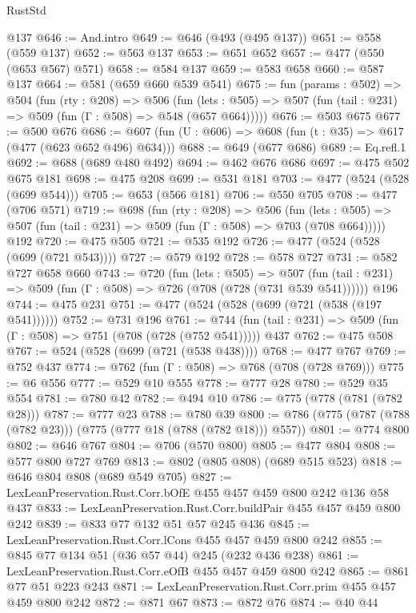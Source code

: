 \begin{lexlean}{RustStd}
\begin{coremodule}
    @137
@646 := And.intro
@649 := @646 (@493 (@495 @137))
@651 := @558 (@559 @137)
@652 := @563 @137
@653 := @651 @652
@657 := @477 (@550 (@653 @567) @571)
@658 := @584 @137
@659 := @583 @658
@660 := @587 @137
@664 := @581 (@659 @660 @539 @541)
@675 := fun (params : @502) =>
  @504
    (fun (rty : @208) =>
    @506
      (fun (lets : @505) => @507 (fun (tail : @231) => @509 (fun (Γ : @508) => @548 (@657 @664)))))
@676 := @503 @675
@677 := @500 @676
@686 := @607 (fun (U : @606) => @608 (fun (t : @35) => @617 (@477 (@623 @652 @496) @634)))
@688 := @649 (@677 @686)
@689 := Eq.refl.{1}
@692 := @688 (@689 @480 @492)
@694 := @462 @676 @686
@697 := @475 @502 @675 @181
@698 := @475 @208
@699 := @531 @181
@703 := @477 (@524 (@528 (@699 @544)))
@705 := @653 (@566 @181)
@706 := @550 @705
@708 := @477 (@706 @571)
@719 := @698
    (fun (rty : @208) =>
    @506
      (fun (lets : @505) => @507 (fun (tail : @231) => @509 (fun (Γ : @508) => @703 (@708 @664)))))
    @192
@720 := @475 @505
@721 := @535 @192
@726 := @477 (@524 (@528 (@699 (@721 @543))))
@727 := @579 @192
@728 := @578 @727
@731 := @582 @727 @658 @660
@743 := @720
    (fun (lets : @505) =>
    @507 (fun (tail : @231) => @509 (fun (Γ : @508) => @726 (@708 (@728 (@731 @539 @541))))))
    @196
@744 := @475 @231
@751 := @477 (@524 (@528 (@699 (@721 (@538 (@197 @541))))))
@752 := @731 @196
@761 := @744 (fun (tail : @231) => @509 (fun (Γ : @508) => @751 (@708 (@728 (@752 @541))))) @437
@762 := @475 @508
@767 := @524 (@528 (@699 (@721 (@538 @438))))
@768 := @477 @767
@769 := @752 @437
@774 := @762 (fun (Γ : @508) => @768 (@708 (@728 @769)))
@775 := @6 @556
@777 := @529 @10 @555
@778 := @777 @28
@780 := @529 @35 @554
@781 := @780 @42
@782 := @494 @10
@786 := @775 (@778 (@781 (@782 @28)))
@787 := @777 @23
@788 := @780 @39
@800 := @786 (@775 (@787 (@788 (@782 @23))) (@775 (@777 @18 (@788 (@782 @18))) @557))
@801 := @774 @800
@802 := @646 @767
@804 := @706 (@570 @800)
@805 := @477 @804
@808 := @577 @800 @727 @769
@813 := @802 (@805 @808) (@689 @515 @523)
@818 := @646 @804 @808 (@689 @549 @705)
@827 := LexLeanPreservation.Rust.Corr.bOfE @455 @457 @459 @800 @242 @136 @58 @437
@833 := LexLeanPreservation.Rust.Corr.buildPair @455 @457 @459 @800 @242
@839 := @833 @77 @132 @51 @57 @245 @436
@845 := LexLeanPreservation.Rust.Corr.lCons @455 @457 @459 @800 @242
@855 := @845 @77 @134 @51 (@36 @57 @44) @245 (@232 @436 @238)
@861 := LexLeanPreservation.Rust.Corr.eOfB @455 @457 @459 @800 @242
@865 := @861 @77 @51 @223 @243
@871 := LexLeanPreservation.Rust.Corr.prim @455 @457 @459 @800 @242
@872 := @871 @67
@873 := @872 @76
@874 := @40 @44

\end{coremodule}
\end{lexlean}
